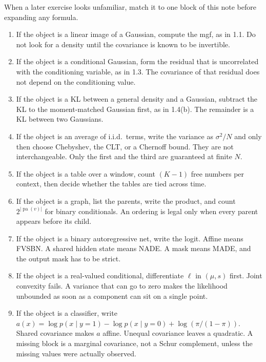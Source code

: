 \documentclass[11pt]{article}
\theoremstyle{remark}
\newcommand{\pa}{\operatorname{pa}}
\begin{document}
When a later exercise looks unfamiliar, match it to one block of this note before expanding any formula.

\begin{enumerate}
\item If the object is a linear image of a Gaussian, compute the mgf, as in 1.1. Do not look for a density until the covariance is known to be invertible.
\item If the object is a conditional Gaussian, form the residual that is uncorrelated with the conditioning variable, as in 1.3. The covariance of that residual does not depend on the conditioning value.
\item If the object is a KL between a general density and a Gaussian, subtract the KL to the moment-matched Gaussian first, as in 1.4(b). The remainder is a KL between two Gaussians.
\item If the object is an average of i.i.d.\ terms, write the variance as \(\sigma^2/N\) and only then choose Chebyshev, the CLT, or a Chernoff bound. They are not interchangeable. Only the first and the third are guaranteed at finite \(N\).
\item If the object is a table over a window, count \((K-1)\) free numbers per context, then decide whether the tables are tied across time.
\item If the object is a graph, list the parents, write the product, and count \(2^{|\pa(v)|}\) for binary conditionals. An ordering is legal only when every parent appears before its child.
\item If the object is a binary autoregressive net, write the logit. Affine means FVSBN. A shared hidden state means NADE. A mask means MADE, and the output mask has to be strict.
\item If the object is a real-valued conditional, differentiate \(\ell\) in \((\mu,s)\) first. Joint convexity fails. A variance that can go to zero makes the likelihood unbounded as soon as a component can sit on a single point.
\item If the object is a classifier, write \(a(x)=\log p(x\mid y=1)-\log p(x\mid y=0)+\log(\pi/(1-\pi))\). Shared covariance makes \(a\) affine. Unequal covariance leaves a quadratic. A missing block is a marginal covariance, not a Schur complement, unless the missing values were actually observed.
\end{enumerate}
\end{document}
